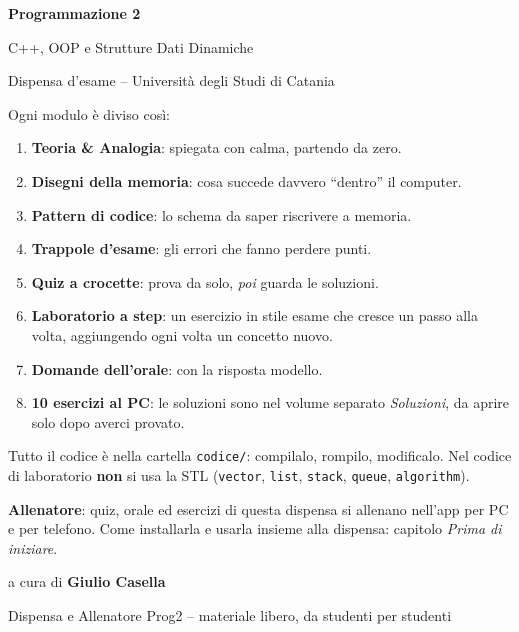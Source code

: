 \begin{titlepage}
  \centering
  \vspace*{2.5cm}
  {\Huge\bfseries Programmazione 2\par}
  \vspace{0.6cm}
  {\Large C++, OOP e Strutture Dati Dinamiche\par}
  \vspace{0.4cm}
  {\large Dispensa d'esame -- Università degli Studi di Catania\par}
  \vspace{1.5cm}
  \begin{tcolorbox}[colback=blue!4!sfondo,colframe=blue!55!black,width=0.85\textwidth,title=Come usare questa dispensa]
    Ogni modulo è diviso così:
    \begin{enumerate}[leftmargin=1.5em]
      \item \textbf{Teoria \& Analogia}: spiegata con calma, partendo da zero.
      \item \textbf{Disegni della memoria}: cosa succede davvero ``dentro'' il computer.
      \item \textbf{Pattern di codice}: lo schema da saper riscrivere a memoria.
      \item \textbf{Trappole d'esame}: gli errori che fanno perdere punti.
      \item \textbf{Quiz a crocette}: prova da solo, \emph{poi} guarda le soluzioni.
      \item \textbf{Laboratorio a step}: un esercizio in stile esame che cresce
            un passo alla volta, aggiungendo ogni volta un concetto nuovo.
      \item \textbf{Domande dell'orale}: con la risposta modello.
      \item \textbf{10 esercizi al PC}: le soluzioni sono nel volume separato
            \emph{Soluzioni}, da aprire solo dopo averci provato.
    \end{enumerate}
    Tutto il codice è nella cartella \texttt{codice/}: compilalo, rompilo,
    modificalo. Nel codice di laboratorio \textbf{non} si usa la STL
    (\texttt{vector}, \texttt{list}, \texttt{stack}, \texttt{queue}, \texttt{algorithm}).
    \par\smallskip\textbf{Allenatore}: quiz, orale ed esercizi di questa dispensa si
    allenano nell'app per PC e per telefono. Come installarla e usarla insieme alla
    dispensa: capitolo \emph{Prima di iniziare}.
  \end{tcolorbox}
  \vfill
  {\large a cura di \textbf{Giulio Casella}\par}
  \vspace{0.2cm}
  {\small Dispensa e Allenatore Prog2 -- materiale libero, da studenti per studenti\par}
\end{titlepage}


